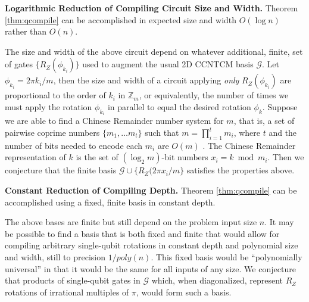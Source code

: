 \begin{conjecture}{\textbf{Logarithmic Reduction of Compiling Circuit Size and Width.}}
Theorem \ref{thm:qcompile} can be accomplished in expected size
and width $O(\log n)$ rather than $O(n)$.
\end{conjecture}

The size and width of the above circuit depend on whatever additional,
finite, set of 
gates
$\{ R_Z(\phi_{k_i}) \}$ used to augment the usual \textsf{2D CCNTCM} basis
$\mathcal{G}$. Let $\phi_{k_i} = 2\pi k_i / m$, then the size and width of
a circuit applying \emph{only} $R_Z(\phi_{k_i})$
are proportional to the order of $k_i$ in
$\mathbb{Z}_m$, or equivalently, the number of times we must apply
the rotation $\phi_{k_i}$ in parallel to equal the desired rotation
$\phi_k$. Suppose we are able to find a Chinese Remainder number system
for $m$, that is, a set of pairwise coprime numbers $\{m_1, \ldots m_{t}\}$
such that $m = \prod_{i=1}^t m_i $, where $t$ and the number of bits
needed to encode each $m_i$ are $O(m)$ \cite{Yeh1996}.
The Chinese Remainder representation of $k$
is the set of $(\log_2 m)$-bit numbers
$x_i = k \bmod m_i$. 
Then we conjecture that
the finite basis $\mathcal{G} \cup \{R_Z(2\pi x_i / m\}$ satisfies the
properties above.

\begin{conjecture}{\textbf{Constant Reduction of Compiling Depth.}}
Theorem \ref{thm:qcompile} can be accomplished using a fixed,
finite basis in constant depth.
\end{conjecture}

The above bases are finite but still depend on the problem input
size $n$. It may be possible to find a basis that
is both fixed and finite that would allow for compiling
arbitrary single-qubit rotations in constant depth and polynomial
size and width, still to precision $1 / poly(n)$. This fixed
basis would be ``polynomially universal'' in that it would be
the same for all inputs of any size.
We conjecture that products of single-qubit gates in
$\mathcal{G}$ which, when diagonalized, represent $R_Z$ rotations
of irrational multiples of $\pi$, would form such a basis.